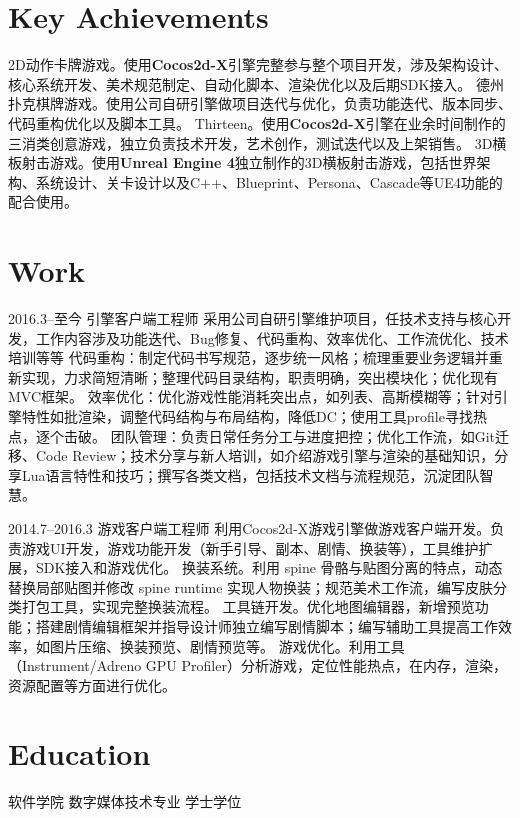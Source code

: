 \documentclass[full]{rvca}
\begin{document}
\subsection{}

\section{Key Achievements}

\achievements
{2D动作卡牌游戏。使用\textbf{Cocos2d-X}引擎完整参与整个项目开发，涉及架构设计、核心系统开发、美术规范制定、自动化脚本、渲染优化以及后期SDK接入。}
{德州扑克棋牌游戏。使用公司自研引擎做项目迭代与优化，负责功能迭代、版本同步、代码重构优化以及脚本工具。}
{Thirteen。使用\textbf{Cocos2d-X}引擎在业余时间制作的三消类创意游戏，独立负责技术开发，艺术创作，测试迭代以及上架销售。}
{3D横板射击游戏。使用\textbf{Unreal Engine 4}独立制作的3D横板射击游戏，包括世界架构、系统设计、关卡设计以及C++、Blueprint、Persona、Cascade等UE4功能的配合使用。}
{}

\section{Work}

{2016.3--至今}
{引擎客户端工程师}
{采用公司自研引擎维护项目，任技术支持与核心开发，工作内容涉及功能迭代、Bug修复、代码重构、效率优化、工作流优化、技术培训等等}
{代码重构：制定代码书写规范，逐步统一风格；梳理重要业务逻辑并重新实现，力求简短清晰；整理代码目录结构，职责明确，突出模块化；优化现有MVC框架。}
{效率优化：优化游戏性能消耗突出点，如列表、高斯模糊等；针对引擎特性如批渲染，调整代码结构与布局结构，降低DC；使用工具profile寻找热点，逐个击破。}
{团队管理：负责日常任务分工与进度把控；优化工作流，如Git迁移、Code Review；技术分享与新人培训，如介绍游戏引擎与渲染的基础知识，分享Lua语言特性和技巧；撰写各类文档，包括技术文档与流程规范，沉淀团队智慧。}
{}

{2014.7--2016.3}%
{游戏客户端工程师} %
{利用Cocos2d-X游戏引擎做游戏客户端开发。负责游戏UI开发，游戏功能开发（新手引导、副本、剧情、换装等），工具维护扩展，SDK接入和游戏优化。}%
{换装系统。利用 spine 骨骼与贴图分离的特点，动态替换局部贴图并修改 spine runtime 实现人物换装；规范美术工作流，编写皮肤分类打包工具，实现完整换装流程。}
{工具链开发。优化地图编辑器，新增预览功能；搭建剧情编辑框架并指导设计师独立编写剧情脚本；编写辅助工具提高工作效率，如图片压缩、换装预览、剧情预览等。}
{游戏优化。利用工具（Instrument/Adreno GPU Profiler）分析游戏，定位性能热点，在内存，渲染，资源配置等方面进行优化。}
{}

\section{Education}

{{软件学院}}
{数字媒体技术专业} {学士学位}
\end{document}
